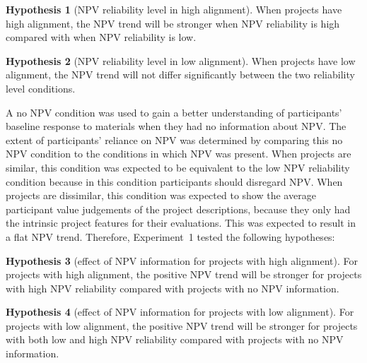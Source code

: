 \documentclass[a4paper, nobind]{templates/ociamthesis}
\theoremstyle{definition}
\theoremstyle{definition}
\theoremstyle{definition}
\theoremstyle{definition}
\newtheorem{hypothesis}{Hypothesis}[chapter]
\theoremstyle{remark}
\begin{document}
\begin{hypothesis}[NPV reliability level in high alignment]
\protect\hypertarget{hyp:allocation-alignment-high-alignment-2}{}{\label{hyp:allocation-alignment-high-alignment-2} \iffalse (NPV reliability level in high alignment) \fi{} }When projects have high alignment, the NPV trend will be stronger when NPV
reliability is high compared with when NPV reliability is low.
\end{hypothesis}

\begin{hypothesis}[NPV reliability level in low alignment]
\protect\hypertarget{hyp:allocation-alignment-low-alignment-2}{}{\label{hyp:allocation-alignment-low-alignment-2} \iffalse (NPV reliability level in low alignment) \fi{} }When projects have low alignment, the NPV trend will not differ significantly
between the two reliability level conditions.
\end{hypothesis}

A no NPV condition was used to gain a better understanding of participants'
baseline response to materials when they had no information about NPV. The
extent of participants' reliance on NPV was determined by comparing this no NPV
condition to the conditions in which NPV was present. When projects are similar,
this condition was expected to be equivalent to the low NPV reliability
condition because in this condition participants should disregard NPV. When
projects are dissimilar, this condition was expected to show the average
participant value judgements of the project descriptions, because they only had
the intrinsic project features for their evaluations. This was expected to
result in a flat NPV trend. Therefore, Experiment~1 tested the following
hypotheses:

\begin{hypothesis}[effect of NPV information for projects with high alignment]
\protect\hypertarget{hyp:allocation-alignment-high-no-NPV-alignment-2}{}{\label{hyp:allocation-alignment-high-no-NPV-alignment-2} \iffalse (effect of NPV information for projects with high alignment) \fi{} }For projects with high alignment, the positive NPV trend will be stronger for
projects with high NPV reliability compared with projects with no NPV
information.
\end{hypothesis}

\begin{hypothesis}[effect of NPV information for projects with low alignment]
\protect\hypertarget{hyp:allocation-alignment-low-no-NPV-alignment-2}{}{\label{hyp:allocation-alignment-low-no-NPV-alignment-2} \iffalse (effect of NPV information for projects with low alignment) \fi{} }For projects with low alignment, the positive NPV trend will be stronger for
projects with both low and high NPV reliability compared with projects with no
NPV information.
\end{hypothesis}
\end{document}
